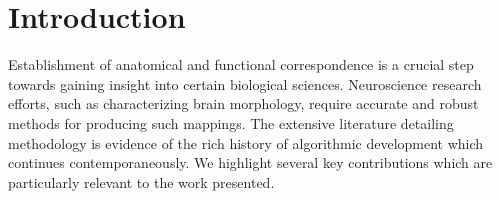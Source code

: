 \documentclass{frontiersSCNS}
\begin{document}
%
%
%







\section{Introduction}

Establishment of anatomical and functional correspondence
is a crucial step towards gaining insight into certain biological 
sciences.  Neuroscience research efforts, such as characterizing 
brain morphology, require accurate and robust methods for
producing such mappings.  The 
extensive literature detailing methodology is evidence of the rich history of 
algorithmic development which continues contemporaneously.
We highlight several key contributions which are particularly relevant to the work presented.
\end{document}
